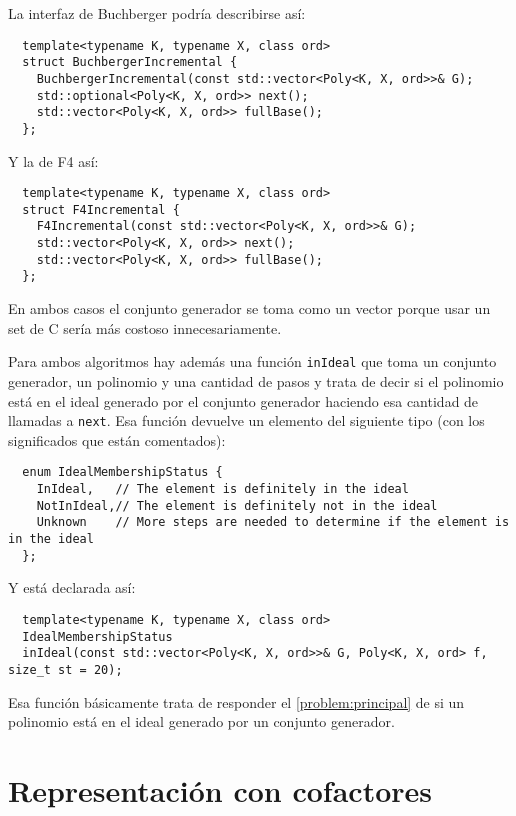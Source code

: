 \documentclass[12pt]{report}
\theoremstyle{customstyle}
\theoremstyle{factstyle}
\newcommand\cpp{C\nolinebreak[4]\hspace{-.05em}\raisebox{.4ex}{\relsize{-3}{\textbf{++}}}\xspace}
\begin{document}
La interfaz de Buchberger podría describirse así:

\begin{verbatim}
  template<typename K, typename X, class ord>
  struct BuchbergerIncremental {
    BuchbergerIncremental(const std::vector<Poly<K, X, ord>>& G);
    std::optional<Poly<K, X, ord>> next();
    std::vector<Poly<K, X, ord>> fullBase();
  };
\end{verbatim}

Y la de F4 así:

\begin{verbatim}
  template<typename K, typename X, class ord>
  struct F4Incremental {
    F4Incremental(const std::vector<Poly<K, X, ord>>& G);
    std::vector<Poly<K, X, ord>> next();
    std::vector<Poly<K, X, ord>> fullBase();
  };
\end{verbatim}

En ambos casos el conjunto generador se toma como un vector porque usar un set de \cpp sería más costoso innecesariamente.

Para ambos algoritmos hay además una función \texttt{inIdeal} que toma un conjunto generador, un polinomio y una cantidad de pasos y trata de decir si el polinomio está en el ideal generado por el conjunto generador haciendo esa cantidad de llamadas a \texttt{next}. Esa función devuelve un elemento del siguiente tipo (con los significados que están comentados):

\begin{verbatim}
  enum IdealMembershipStatus {
    InIdeal,   // The element is definitely in the ideal
    NotInIdeal,// The element is definitely not in the ideal
    Unknown    // More steps are needed to determine if the element is in the ideal
  };
\end{verbatim}

\noindent Y está declarada así:

\begin{verbatim}
  template<typename K, typename X, class ord>
  IdealMembershipStatus
  inIdeal(const std::vector<Poly<K, X, ord>>& G, Poly<K, X, ord> f, size_t st = 20);
\end{verbatim}

Esa función básicamente trata de responder el \cref{problem:principal} de si un polinomio está en el ideal generado por un conjunto generador.

\section{Representación con cofactores}\label{section:representación con cofectores (librería)}
\end{document}
